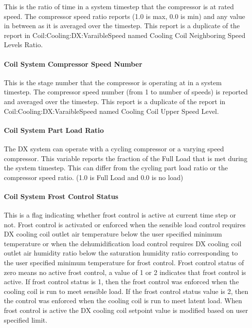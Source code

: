 This is the ratio of time in a system timestep that the compressor is at rated speed. The compressor speed ratio reports (1.0 is max, 0.0 is min) and any value in between as it is averaged over the timestep. This report is a duplicate of the report in Coil:Cooling:DX:VaraibleSpeed named Cooling Coil Neighboring Speed Levels Ratio.

\paragraph{Coil System Compressor Speed Number}\label{coil-system-compressor-speed-ratio}

This is the stage number that the compressor is operating at in a system timestep. The compressor speed number (from 1 to number of speeds) is reported and averaged over the timestep. This report is a duplicate of the report in Coil:Cooling:DX:VaraibleSpeed named Cooling Coil Upper Speed Level.

\paragraph{Coil System Part Load Ratio}\label{coil-system-part-load-ratio}

The DX system can operate with a cycling compressor or a varying speed compressor. This variable reports the fraction of the Full Load that is met during the system timestep. This can differ from the cycling part load ratio or the compressor speed ratio. (1.0 is Full Load and 0.0 is no load)

\paragraph{Coil System Frost Control Status}\label{coil-system-frost-control-status}

This is a flag indicating whether frost control is active at current time step or not. Frost control is activated or enforced when the sensible load control requires DX cooling coil outlet air temperature below the user specified minimum temperature or when the dehumidification load control requires DX cooling coil outlet air humidity ratio below the saturation humidity ratio corresponding to the user specified minimum temperature for frost control. Frost control status of zero means no active frost control, a value of 1 or 2 indicates that frost control is active. If frost control status is 1, then the frost control was enforced when the cooling coil is run to meet sensible load. If the frost control status value is 2, then the control was enforced when the cooling coil is run to meet latent load. When frost control is active the DX cooling coil setpoint value is modified based on user specified limit.

